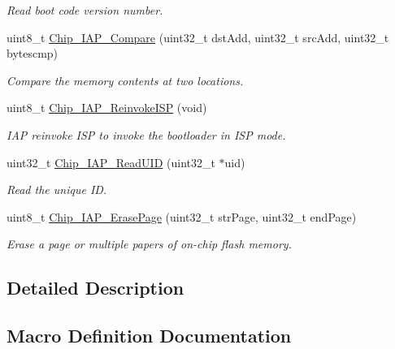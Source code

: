 \begin{DoxyCompactItemize}
\begin{DoxyCompactList}\small\item\em Read boot code version number. \end{DoxyCompactList}\item 
uint8\+\_\+t \hyperlink{group___c_o_m_m_o_n___i_a_p_ga0f3983319210f99d1931f1e9fa762d9e}{Chip\+\_\+\+I\+A\+P\+\_\+\+Compare} (uint32\+\_\+t dst\+Add, uint32\+\_\+t src\+Add, uint32\+\_\+t bytescmp)
\begin{DoxyCompactList}\small\item\em Compare the memory contents at two locations. \end{DoxyCompactList}\item 
uint8\+\_\+t \hyperlink{group___c_o_m_m_o_n___i_a_p_ga91a6ef5cac3a052f637cf0b5d7d31d53}{Chip\+\_\+\+I\+A\+P\+\_\+\+Reinvoke\+I\+SP} (void)
\begin{DoxyCompactList}\small\item\em I\+AP reinvoke I\+SP to invoke the bootloader in I\+SP mode. \end{DoxyCompactList}\item 
uint32\+\_\+t \hyperlink{group___c_o_m_m_o_n___i_a_p_gadf10e245b3a9c4713598cce332b52414}{Chip\+\_\+\+I\+A\+P\+\_\+\+Read\+U\+ID} (uint32\+\_\+t $\ast$uid)
\begin{DoxyCompactList}\small\item\em Read the unique ID. \end{DoxyCompactList}\item 
uint8\+\_\+t \hyperlink{group___c_o_m_m_o_n___i_a_p_ga95ca28fb39884184657054e134671f95}{Chip\+\_\+\+I\+A\+P\+\_\+\+Erase\+Page} (uint32\+\_\+t str\+Page, uint32\+\_\+t end\+Page)
\begin{DoxyCompactList}\small\item\em Erase a page or multiple papers of on-\/chip flash memory. \end{DoxyCompactList}\end{DoxyCompactItemize}


\subsection{Detailed Description}


\subsection{Macro Definition Documentation}
\mbox{\label{group___c_o_m_m_o_n___i_a_p_gaaff51c256373e4a20f8dab1adc1300f3}} 
